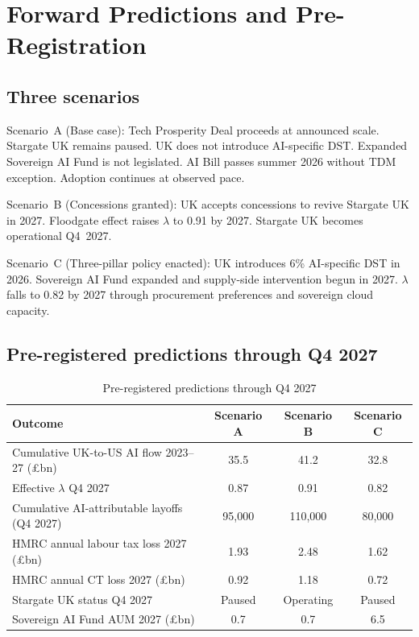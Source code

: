 \documentclass[11pt,letterpaper]{article}
\theoremstyle{remark}
\begin{document}
\section{Forward Predictions and Pre-Registration}

\subsection{Three scenarios}

Scenario~A (Base case): Tech Prosperity Deal proceeds at announced scale. Stargate {UK} remains paused. {UK} does not introduce {AI}-specific {DST}. Expanded Sovereign {AI} Fund is not legislated. {AI} Bill passes summer 2026 without {TDM} exception. Adoption continues at observed pace.

Scenario~B (Concessions granted): {UK} accepts concessions to revive Stargate {UK} in 2027. Floodgate effect raises $\lambda$ to 0.91 by 2027. Stargate {UK} becomes operational Q4~2027.

Scenario~C (Three-pillar policy enacted): {UK} introduces 6\% {AI}-specific {DST} in 2026. Sovereign {AI} Fund expanded and supply-side intervention begun in 2027. $\lambda$ falls to 0.82 by 2027 through procurement preferences and sovereign cloud capacity.

\subsection{Pre-registered predictions through Q4 2027}

\begin{table}[h]
\centering
\caption{Pre-registered predictions through Q4 2027}
\begin{tabular}{lccc}
\toprule
Outcome & Scenario A & Scenario B & Scenario C \\
\midrule
Cumulative {UK}-to-{US} {AI} flow 2023--27 (\pounds bn) & 35.5 & 41.2 & 32.8 \\
Effective $\lambda$ Q4 2027 & 0.87 & 0.91 & 0.82 \\
Cumulative {AI}-attributable layoffs (Q4 2027) & 95{,}000 & 110{,}000 & 80{,}000 \\
HMRC annual labour tax loss 2027 (\pounds bn) & 1.93 & 2.48 & 1.62 \\
HMRC annual {CT} loss 2027 (\pounds bn) & 0.92 & 1.18 & 0.72 \\
Stargate {UK} status Q4 2027 & Paused & Operating & Paused \\
Sovereign {AI} Fund {AUM} 2027 (\pounds bn) & 0.7 & 0.7 & 6.5 \\
\bottomrule
\end{tabular}
\end{table}
\end{document}
